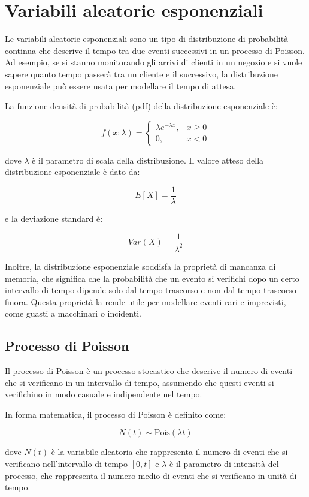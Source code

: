 \section{Variabili aleatorie esponenziali}

Le variabili aleatorie esponenziali sono un tipo di distribuzione di probabilità continua che descrive il tempo tra due eventi successivi in un processo di Poisson. Ad esempio, se si stanno monitorando gli arrivi di clienti in un negozio e si vuole sapere quanto tempo passerà tra un cliente e il successivo, la distribuzione esponenziale può essere usata per modellare il tempo di attesa.

La funzione densità di probabilità (pdf) della distribuzione esponenziale è:

$$f(x;\lambda) = \begin{cases} \lambda e^{-\lambda x}, & x \geq 0 \\ 0, & x < 0 \end{cases}$$

dove $\lambda$ è il parametro di scala della distribuzione. Il valore atteso della distribuzione esponenziale è dato da:

$$E[X] = \frac{1}{\lambda}$$

e la deviazione standard è:

$$Var(X) = \frac{1}{\lambda^2}$$

Inoltre, la distribuzione esponenziale soddisfa la proprietà di mancanza di memoria, che significa che la probabilità che un evento si verifichi dopo un certo intervallo di tempo dipende solo dal tempo trascorso e non dal tempo trascorso finora. Questa proprietà la rende utile per modellare eventi rari e imprevisti, come guasti a macchinari o incidenti.

\subsection{Processo di Poisson}

Il processo di Poisson è un processo stocastico che descrive il numero di eventi che si verificano in un intervallo di tempo, assumendo che questi eventi si verifichino in modo casuale e indipendente nel tempo.

In forma matematica, il processo di Poisson è definito come:

$$ N(t) \sim \text{Pois}(\lambda t) $$

dove $N(t)$ è la variabile aleatoria che rappresenta il numero di eventi che si verificano nell'intervallo di tempo $[0,t]$ e $\lambda$ è il parametro di intensità del processo, che rappresenta il numero medio di eventi che si verificano in unità di tempo.

